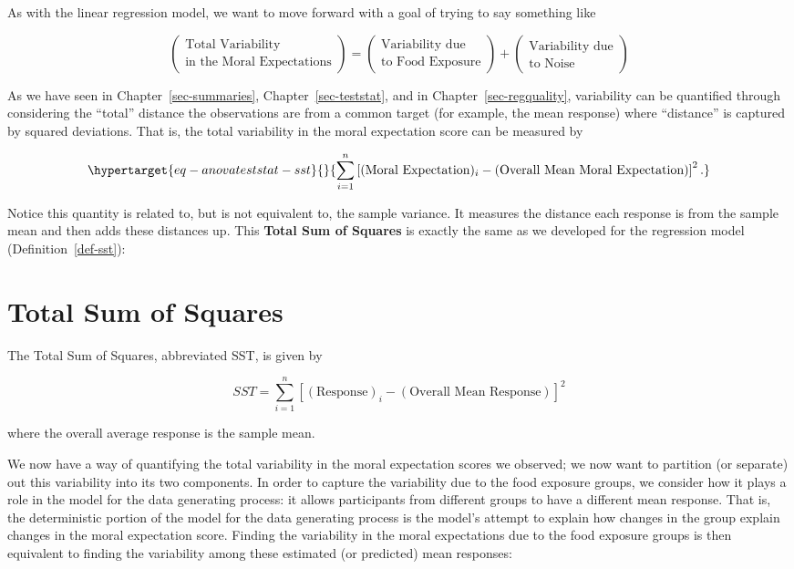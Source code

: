 \documentclass[
  letterpaper,
  DIV=11,
  numbers=noendperiod]{scrreprt}
\theoremstyle{definition}
\theoremstyle{definition}
\theoremstyle{plain}
\theoremstyle{remark}
\begin{document}
As with the linear regression model, we want to move forward with a goal
of trying to say something like

\[\begin{pmatrix} \text{Total Variability} \\ \text{in the Moral Expectations} \end{pmatrix} = \begin{pmatrix} \text{Variability due} \\ \text{to Food Exposure} \end{pmatrix} + \begin{pmatrix} \text{Variability due} \\ \text{to Noise} \end{pmatrix}\]

As we have seen in Chapter~\ref{sec-summaries},
Chapter~\ref{sec-teststat}, and in Chapter~\ref{sec-regquality},
variability can be quantified through considering the ``total'' distance
the observations are from a common target (for example, the mean
response) where ``distance'' is captured by squared deviations. That is,
the total variability in the moral expectation score can be measured by

\begin{equation}\protect\hypertarget{eq-anovateststat-sst}{}{\sum_{i=1}^{n} \left[(\text{Moral Expectation})_i - (\text{Overall Mean Moral Expectation})\right]^2.}\label{eq-anovateststat-sst}\end{equation}

Notice this quantity is related to, but is not equivalent to, the sample
variance. It measures the distance each response is from the sample mean
and then adds these distances up. This \textbf{Total Sum of Squares} is
exactly the same as we developed for the regression model
(Definition~\ref{def-sst}):

\hypertarget{total-sum-of-squares-1}{%
\section{Total Sum of Squares}\label{total-sum-of-squares-1}}

The Total Sum of Squares, abbreviated SST, is given by

\[SST = \sum_{i=1}^{n} \left[(\text{Response})_i - (\text{Overall Mean Response})\right]^2\]

where the overall average response is the sample mean.

We now have a way of quantifying the total variability in the moral
expectation scores we observed; we now want to partition (or separate)
out this variability into its two components. In order to capture the
variability due to the food exposure groups, we consider how it plays a
role in the model for the data generating process: it allows
participants from different groups to have a different mean response.
That is, the deterministic portion of the model for the data generating
process is the model's attempt to explain how changes in the group
explain changes in the moral expectation score. Finding the variability
in the moral expectations due to the food exposure groups is then
equivalent to finding the variability among these estimated (or
predicted) mean responses:
\end{document}
